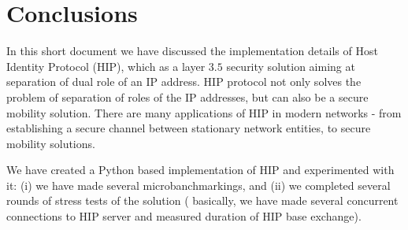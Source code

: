 \section{Conclusions}
\label{section:conclusion}

In this short document we have discussed the implementation 
details of Host Identity Protocol (HIP), which as a layer $3.5$ 
security solution aiming at separation of dual role of an IP
address. HIP protocol not only solves the problem of separation
of roles of the IP addresses, but can also be a secure mobility
solution. There are many applications of HIP in modern networks -
from establishing a secure channel between stationary network
entities, to secure mobility solutions.

We have created a Python based implementation of HIP and experimented
with it: (i) we have made several microbanchmarkings, and (ii)
we completed several rounds of stress tests of the solution (
basically, we have made several concurrent connections to HIP
server and measured duration of HIP base exchange).
